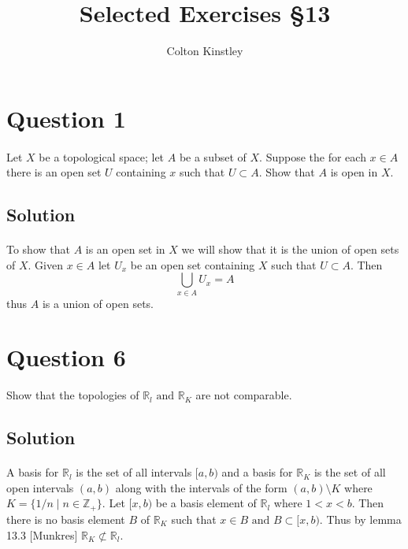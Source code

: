 \documentclass[11pt, oneside]{article}   	%
\title{Selected Exercises \S13}
\author{Colton Kinstley}
\newcommand{\R}{\mathbb{R}}
\newcommand{\bb}[1]{\mathbb{#1}}
\newcommand{\tand}{\text{ and }}
\begin{document}
\maketitle

\section*{Question 1}
\paragraph{}

Let $X$ be a topological space; let $A$ be a subset of $X$. Suppose the for each $x \in A$ there is an open set $U$ containing $x$ such that $U \subset A $. Show that $A$ is open in $X$.


\subsection*{Solution}
\paragraph{}

To show that $A$ is an open set in $X$ we will show that it is the union of open sets of $X$. Given $x \in  A$ let $U_x$ be an open set containing $X$ such that $U \subset A$. Then
\[
\bigcup_{x \in A} U_x = A
\]
thus $A$ is a union of open sets.


\section*{Question 6}

Show that the topologies of $\mathbb{R}_l \text{ and } \mathbb{R}_K$ are not comparable. 

\subsection*{Solution}
\paragraph{}

A basis for $\R_l$ is the set of all intervals $[a,b)$ and a basis for $\R_K$ is the set of all open intervals $(a,b)$ along with the intervals of the form $(a,b) \setminus K$ where $ K = \{1/n \mid n \in \bb{Z_+}\}$. Let $[x,b) $ be a basis element of $\R_l$ where $1< x< b$. Then there is no basis element $B$ of $\R_K$ such that $x \in B \tand B \subset [x,b)$. Thus by lemma 13.3 [Munkres] $\R_K \not\subset \R_l$.
\end{document}
